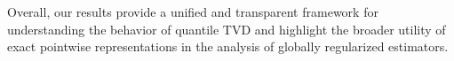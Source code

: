 \documentclass[11pt]{article}
\theoremstyle{plain}
\theoremstyle{definition}
\theoremstyle{remark}
\begin{document}
Overall, our results provide a unified and transparent framework for understanding the behavior of quantile TVD and highlight the broader utility of exact pointwise representations in the analysis of globally regularized estimators.






\end{document}
